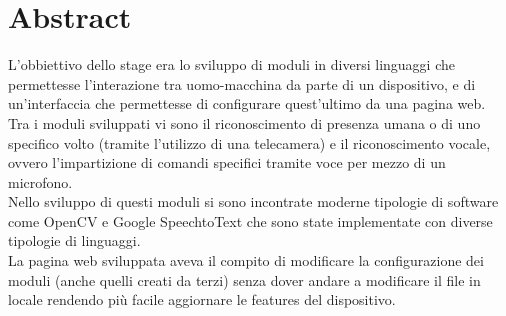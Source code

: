 \chapter*{Abstract}

L'obbiettivo dello stage era lo sviluppo di moduli in diversi linguaggi
che permettesse l'interazione tra uomo-macchina da parte di un dispositivo,
e di un'interfaccia che permettesse di configurare quest'ultimo da una
pagina web.
\\[2\baselineskip]
Tra i moduli sviluppati vi sono il riconoscimento di presenza umana o di uno
specifico volto (tramite l'utilizzo di una telecamera) e il riconoscimento
vocale, ovvero l'impartizione di comandi specifici tramite voce
per mezzo di un microfono.
\\[2\baselineskip]
Nello sviluppo di questi moduli si sono incontrate moderne tipologie di software
come OpenCV e Google SpeechtoText che sono state implementate con diverse
tipologie di linguaggi.
\\[2\baselineskip]
La pagina web sviluppata aveva il compito di modificare la configurazione
dei moduli (anche quelli creati da terzi) senza dover andare a modificare il
file in locale rendendo più facile aggiornare le features del dispositivo.
